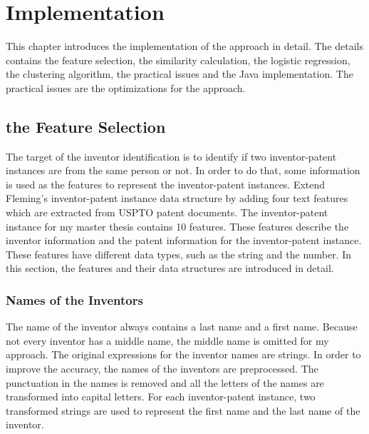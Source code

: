 \chapter{Implementation}
\label{cha:impl}
This chapter introduces the implementation of the approach in detail. The details contains the feature selection, the similarity calculation, the logistic regression, the clustering algorithm, the practical issues and the Java implementation. The practical issues are the optimizations for the approach.
 
\section{the Feature Selection}
The target of the inventor identification is to identify if two inventor-patent instances are from the same person or not. In order to do that, some information is used as the features to represent the inventor-patent instances. Extend Fleming's \cite{RePEc:eee:respol:v:43:y:2014:i:6:p:941-955} inventor-patent instance data structure by adding four text features which are extracted from USPTO patent documents. The inventor-patent instance for my master thesis contains 10 features. These features describe the inventor information and the patent information for the inventor-patent instance. These features have different data types, such as the string and the number. In this section, the features and their data structures are introduced in detail.


\subsection{Names of the Inventors}
The name of the inventor always contains a last name and a first name. Because not every inventor has a middle name, the middle name is omitted for my approach. The original expressions for the inventor names are strings. In order to improve the accuracy, the names of the inventors are preprocessed. The punctuation in the names is removed and all the letters of the names are transformed into capital letters. For each inventor-patent instance, two transformed strings are used to represent the first name and the last name of the inventor. 

